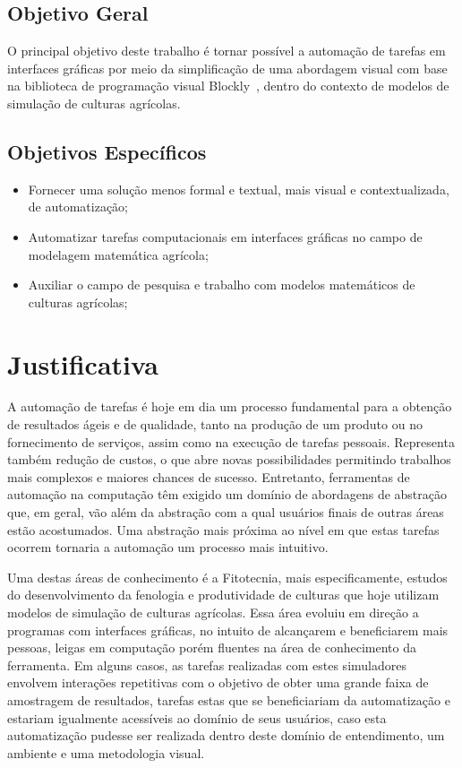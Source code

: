 \documentclass[12pt]{article}
\begin{document}
    	\subsection{Objetivo Geral}

    	O principal objetivo deste trabalho é tornar possível a automação de tarefas em interfaces gráficas por meio da simplificação de uma abordagem visual com base na biblioteca de programação visual Blockly~\cite{blocklyResource}, dentro do contexto de modelos de simulação de culturas agrícolas.

    	\subsection{Objetivos Específicos}

    	\begin{itemize}
    		\item Fornecer uma solução menos formal e textual, mais visual e contextualizada, de automatização;
    		\item Automatizar tarefas computacionais em interfaces gráficas no campo de modelagem matemática agrícola;
    		\item Auxiliar o campo de pesquisa e trabalho com modelos matemáticos de culturas agrícolas;
    	\end{itemize}

    	\section{Justificativa}

    	A automação de tarefas é hoje em dia um processo fundamental para a obtenção de resultados ágeis e de qualidade, tanto na produção de um produto ou no fornecimento de serviços, assim como na execução de tarefas pessoais. Representa também redução de custos, o que abre novas possibilidades permitindo trabalhos mais complexos e maiores chances de sucesso. Entretanto, ferramentas de automação na computação têm exigido um domínio de abordagens de abstração que, em geral, vão além da abstração com a qual usuários finais de outras áreas estão acostumados. Uma abstração mais próxima ao nível em que estas tarefas ocorrem tornaria a automação um processo mais intuitivo.

    	Uma destas áreas de conhecimento é a Fitotecnia, mais especificamente, estudos do desenvolvimento da fenologia e produtividade de culturas que hoje utilizam modelos de simulação de culturas agrícolas. Essa área evoluiu em direção a programas com interfaces gráficas, no intuito de alcançarem e beneficiarem mais pessoas, leigas em computação porém fluentes na área de conhecimento da ferramenta. Em alguns casos, as tarefas realizadas com estes simuladores envolvem interações repetitivas com o objetivo de obter uma grande faixa de amostragem de resultados, tarefas estas que se beneficiariam da automatização e estariam igualmente acessíveis ao domínio de seus usuários, caso esta automatização pudesse ser realizada dentro deste domínio de entendimento, um ambiente e uma metodologia visual.
\end{document}
